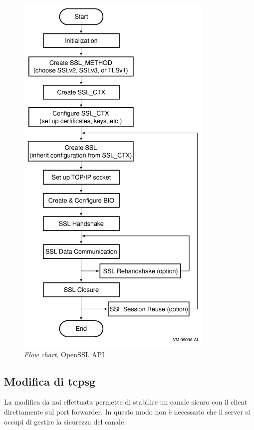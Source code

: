 \documentclass[10pt]{article}  %
\begin{document}
        \begin{figure}[htbp]
            \centering
            \includegraphics[scale=0.45]{ssl.png}
            \caption{\emph{Flow chart}, OpenSSL API}
        \end{figure}
    \subsection{Modifica di tcpsg}
        La modifica da noi effettuata permette di stabilire un canale sicuro con il
        client direttamente sul port forwarder. In questo modo non è necessario che il
        server si occupi di gestire la sicurezza del canale.
\end{document}
